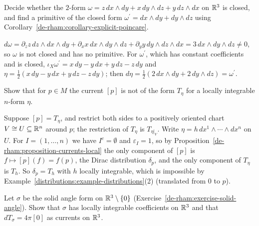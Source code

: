 \begin{exercise}\label{de-rham:exercise-explicit-primitive}
Decide whether the $2$-form $\omega = z\,dx \wedge dy + x\,dy \wedge dz + y\,dz \wedge dx$ on $\mathbb{R}^3$ is closed, and find a primitive of the closed form
$\omega^{\prime} = dx \wedge dy + dy \wedge dz$ using Corollary~\ref{de-rham:corollary-explicit-poincare}.
\end{exercise}

\begin{solution}
$d\omega = \partial_zz\,dz \wedge dx \wedge dy + \partial_xx\,dx \wedge dy \wedge dz + \partial_yy\,dy \wedge dz \wedge dx = 3\,dx \wedge dy \wedge dz \neq 0$, so $\omega$ is not closed and has no primitive.
For $\omega^{\prime}$, which has constant coefficients and is closed, $\iota_X\omega^{\prime} = x\,dy - y\,dx + y\,dz - z\,dy$ and $\eta = \frac12(x\,dy - y\,dx + y\,dz - z\,dy)$; then
$d\eta = \frac12(2\,dx \wedge dy + 2\,dy \wedge dz) = \omega^{\prime}$.
\end{solution}

\begin{exercise}\label{de-rham:exercise-dirac-current}
Show that for $p \in M$ the current $[p]$ is not of the form $T_\eta$ for a locally integrable $n$-form $\eta$.
\end{exercise}

\begin{solution}
Suppose $[p] = T_\eta$, and restrict both sides to a positively oriented chart $V \cong U \subseteq \mathbb{R}^n$ around $p$; the restriction of $T_\eta$ is $T_{\eta|_V}$. Write $\eta = h\,dx^1 \wedge \cdots \wedge dx^n$
on $U$. For $I = (1, \ldots, n)$ we have $I^c = \emptyset$ and $\varepsilon_I = 1$, so by Proposition~\ref{de-rham:proposition-currents-local} the only component of $[p]$ is $f \mapsto [p](f) = f(p)$, the Dirac
distribution $\delta_p$, and the only component of $T_\eta$ is $T_h$. So $\delta_p = T_h$ with $h$ locally integrable, which is impossible by
Example~\ref{distributions:example-distributions}(2) (translated from $0$ to $p$).
\end{solution}

\begin{exercise}\label{de-rham:exercise-solid-angle-current}
Let $\sigma$ be the solid angle form on $\mathbb{R}^3 \setminus \{0\}$ (Exercise~\ref{de-rham:exercise-solid-angle}). Show that $\sigma$ has locally integrable coefficients on $\mathbb{R}^3$ and that
$dT_\sigma = 4\pi[0]$ as currents on $\mathbb{R}^3$.
\end{exercise}

